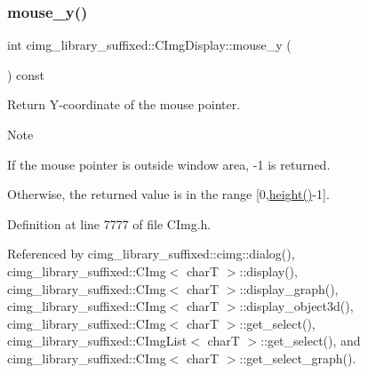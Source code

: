 \subsubsection{\texorpdfstring{mouse\+\_\+y()}{mouse\_y()}}
{\footnotesize\ttfamily int cimg\+\_\+library\+\_\+suffixed\+::\+C\+Img\+Display\+::mouse\+\_\+y (\begin{DoxyParamCaption}{ }\end{DoxyParamCaption}) const\hspace{0.3cm}{\ttfamily [inline]}}



Return Y-\/coordinate of the mouse pointer. 

\begin{DoxyNote}{Note}

\begin{DoxyItemize}
\item If the mouse pointer is outside window area, {\ttfamily -\/1} is returned.
\item Otherwise, the returned value is in the range \mbox{[}0,\hyperlink{structcimg__library__suffixed_1_1CImgDisplay_a5604a6886d51d1070ed2ddc568a848f2}{height()}-\/1\mbox{]}. 
\end{DoxyItemize}
\end{DoxyNote}


Definition at line 7777 of file C\+Img.\+h.



Referenced by cimg\+\_\+library\+\_\+suffixed\+::cimg\+::dialog(), cimg\+\_\+library\+\_\+suffixed\+::\+C\+Img$<$ char\+T $>$\+::display(), cimg\+\_\+library\+\_\+suffixed\+::\+C\+Img$<$ char\+T $>$\+::display\+\_\+graph(), cimg\+\_\+library\+\_\+suffixed\+::\+C\+Img$<$ char\+T $>$\+::display\+\_\+object3d(), cimg\+\_\+library\+\_\+suffixed\+::\+C\+Img$<$ char\+T $>$\+::get\+\_\+select(), cimg\+\_\+library\+\_\+suffixed\+::\+C\+Img\+List$<$ char\+T $>$\+::get\+\_\+select(), and cimg\+\_\+library\+\_\+suffixed\+::\+C\+Img$<$ char\+T $>$\+::get\+\_\+select\+\_\+graph().

